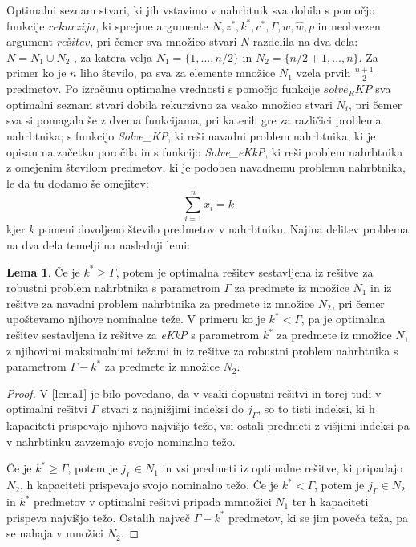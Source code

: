 \documentclass[a4paper,12pt]{article}
\theoremstyle{definition}
\newtheorem{definition}{Lema}
\begin{document}
Optimalni seznam stvari, ki jih vstavimo v nahrbtnik sva dobila s pomočjo funkcije $rekurzija$,
ki sprejme argumente $N, z^*, k^*, c^*,  \Gamma, w, \hat{w}, p$ in neobvezen argument 
$rešitev$,  pri čemer sva množico stvari $N$ razdelila na dva dela: $N = N_1 \cup N_2$ , za 
katera velja $N_1 = \{1, ..., n / 2\} $ in $N_2 = \{n / 2 + 1, ..., n\}$. Za primer ko je $n$ 
liho število, pa sva za elemente množice $N_1$ vzela prvih $\frac{n +1}{2} $ predmetov. Po izračunu
optimalne vrednosti s pomočjo funkcije $solve_RKP$ sva optimalni seznam stvari dobila rekurzivno za 
vsako množico stvari $N_i$, pri čemer sva si pomagala še z dvema funkcijama, pri katerih gre 
za različici problema nahrbtnika; s funkcijo \textit{Solve\_KP}, ki reši navadni problem
nahrbtnika, ki je opisan na začetku poročila in s funkcijo \textit{Solve\_eKkP}, ki reši 
problem nahrbtnika z omejenim številom predmetov, ki je podoben navadnemu problemu nahrbtnika, 
le da tu dodamo še omejitev:
\begin{equation}
\tag*{}   
\sum_{i=1}^{n}x_i = k
\end{equation} kjer $k$ pomeni dovoljeno število predmetov v nahrbtniku.
Najina delitev problema na dva dela temelji na naslednji lemi:
\begin{definition}
Če je $k^* \geq \Gamma$, potem je optimalna rešitev sestavljena iz rešitve za robustni problem 
nahrbtnika s parametrom $\Gamma$ za predmete iz množice $N_1$ in iz rešitve za navadni problem 
nahrbtnika za predmete iz množice $N_2$, pri čemer upoštevamo njihove nominalne teže. 
V primeru ko  je $k^* < \Gamma$, pa je optimalna rešitev sestavljena iz rešitve za
\textit{eKkP} s parametrom $k^*$ za predmete iz množice $N_1$ z njihovimi maksimalnimi 
težami in iz rešitve za robustni problem nahrbtnika s parametrom   $\Gamma - k^*$ za predmete 
iz množice $N_2$.
\end{definition}
\begin{proof}
    V \ref{lema1} je bilo povedano, da v vsaki dopustni rešitvi
    in torej tudi v optimalni rešitvi $\Gamma$ stvari z najnižjimi
    indeksi do $j_\Gamma$, so to tisti indeksi, ki h kapaciteti prispevajo
    njihovo najvišjo težo, vsi ostali predmeti z višjimi indeksi
    pa v nahrbtinku zavzemajo svojo nominalno težo. 
    \par
    Če je $k^* \geq \Gamma$, potem je $j_\Gamma \in N_1$ in vsi predmeti
    iz optimalne rešitve, ki pripadajo $N_2$, h kapaciteti prispevajo
    svojo nominalno težo.
    Če je $k^* < \Gamma$, potem je $j_\Gamma \in N_2$ in $k^*$
    predmetov v optimalni rešitvi pripada mmnožici $N_1$ 
    ter h kapaciteti prispeva najvišjo težo. Ostalih največ
    $\Gamma - k^*$ predmetov, ki se jim poveča teža, pa se nahaja
    v množici $N_2$.
\end{proof}
\end{document}
